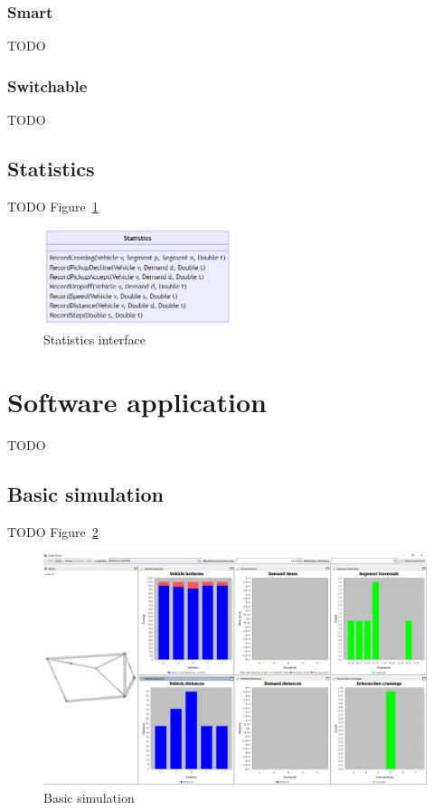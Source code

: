 \documentclass{article}
\begin{document}
    \subsubsection{Smart}
    TODO

    \subsubsection{Switchable}
    TODO

    \subsection{Statistics}
    TODO Figure~\ref{fig:3}

    \begin{figure}
        \centering
        \includegraphics[width=0.5\textwidth]{../../diagrams/statistics/classes.png}
        \caption{Statistics interface}
        \label{fig:3}
    \end{figure}

    \section{Software application}
    \label{sec:app}
    TODO

    \subsection{Basic simulation}
    TODO Figure~\ref{fig:4}

    \begin{figure}
        \centering
        \includegraphics[width=\textwidth]{../../screenshots/basic-simulation.png}
        \caption{Basic simulation}
        \label{fig:4}
    \end{figure}
\end{document}
